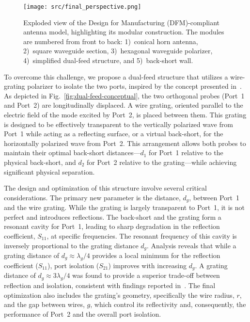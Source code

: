\documentclass[journal,9pt]{IEEEtran}
\begin{document}
\begin{figure}[!b]
\centering
\texttt{[image: src/final\_perspective.png]}
\caption{\label{fig:final-perspective}Exploded view of the Design for Manufacturing (DFM)-compliant antenna model, highlighting its modular construction. The modules are numbered from front to back: 1)~conical horn antenna, 2)~square waveguide section, 3)~hexagonal waveguide polarizer, 4)~simplified dual-feed structure, and 5)~back-short wall.}
\end{figure}

To overcome this challenge, we propose a dual-feed structure that utilizes a wire-grating polarizer to isolate the two ports, inspired by the concept presented in~\cite{karki-et-al:dual-polarized-probe-for-planar-near-field-measurement}. As depicted in Fig.~\ref{fig:dual-feed-conceptual}, the two orthogonal probes (Port~1 and Port~2) are longitudinally displaced. A wire grating, oriented parallel to the electric field of the mode excited by Port~2, is placed between them. This grating is designed to be effectively transparent to the vertically polarized wave from Port~1 while acting as a reflecting surface, or a virtual back-short, for the horizontally polarized wave from Port~2. This arrangement allows both probes to maintain their optimal back-short distances---$d_1$ for Port~1 relative to the physical back-short, and $d_2$ for Port~2 relative to the grating---while achieving significant physical separation.

The design and optimization of this structure involve several critical considerations. The primary new parameter is the distance, $d_g$, between Port~1 and the wire grating. While the grating is largely transparent to Port~1, it is not perfect and introduces reflections. The back-short and the grating form a resonant cavity for Port~1, leading to sharp degradation in the reflection coefficient, $S_{11}$, at specific frequencies. The resonant frequency of this cavity is inversely proportional to the grating distance $d_g$. Analysis reveals that while a grating distance of $d_g \approx \lambda_g/4$ provides a local minimum for the reflection coefficient ($S_{11}$), port isolation ($S_{21}$) improves with increasing $d_g$. A grating distance of $d_g \approx 3\lambda_g/4$ was found to provide a superior trade-off between reflection and isolation, consistent with findings reported in~\cite{karki-et-al:dual-polarized-probe-for-planar-near-field-measurement}. The final optimization also includes the grating's geometry, specifically the wire radius, $r$, and the gap between wires, $g$, which control its reflectivity and, consequently, the performance of Port~2 and the overall port isolation.
\end{document}
